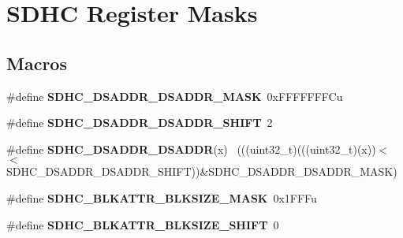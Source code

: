 \hypertarget{group___s_d_h_c___register___masks}{}\section{S\+D\+H\+C Register Masks}
\label{group___s_d_h_c___register___masks}
\subsection*{Macros}
\begin{DoxyCompactItemize}
\item 
\hypertarget{group___s_d_h_c___register___masks_ga0879039aa6d312f63642daf292ea07e1}{}\#define {\bfseries S\+D\+H\+C\+\_\+\+D\+S\+A\+D\+D\+R\+\_\+\+D\+S\+A\+D\+D\+R\+\_\+\+M\+A\+S\+K}~0x\+F\+F\+F\+F\+F\+F\+F\+Cu\label{group___s_d_h_c___register___masks_ga0879039aa6d312f63642daf292ea07e1}

\item 
\hypertarget{group___s_d_h_c___register___masks_gaab7280ffe17d17dc4e36a58270c97edb}{}\#define {\bfseries S\+D\+H\+C\+\_\+\+D\+S\+A\+D\+D\+R\+\_\+\+D\+S\+A\+D\+D\+R\+\_\+\+S\+H\+I\+F\+T}~2\label{group___s_d_h_c___register___masks_gaab7280ffe17d17dc4e36a58270c97edb}

\item 
\hypertarget{group___s_d_h_c___register___masks_gabf3237816737e9f61afc592a4262c3c3}{}\#define {\bfseries S\+D\+H\+C\+\_\+\+D\+S\+A\+D\+D\+R\+\_\+\+D\+S\+A\+D\+D\+R}(x)                                    ~(((uint32\+\_\+t)(((uint32\+\_\+t)(x))$<$$<$S\+D\+H\+C\+\_\+\+D\+S\+A\+D\+D\+R\+\_\+\+D\+S\+A\+D\+D\+R\+\_\+\+S\+H\+I\+F\+T))\&S\+D\+H\+C\+\_\+\+D\+S\+A\+D\+D\+R\+\_\+\+D\+S\+A\+D\+D\+R\+\_\+\+M\+A\+S\+K)\label{group___s_d_h_c___register___masks_gabf3237816737e9f61afc592a4262c3c3}

\item 
\hypertarget{group___s_d_h_c___register___masks_ga15a1d67cd23b4eaae16cf10809520195}{}\#define {\bfseries S\+D\+H\+C\+\_\+\+B\+L\+K\+A\+T\+T\+R\+\_\+\+B\+L\+K\+S\+I\+Z\+E\+\_\+\+M\+A\+S\+K}~0x1\+F\+F\+Fu\label{group___s_d_h_c___register___masks_ga15a1d67cd23b4eaae16cf10809520195}

\item 
\hypertarget{group___s_d_h_c___register___masks_gab4dbeb59800b35d4f9e1d12f27a3f4d8}{}\#define {\bfseries S\+D\+H\+C\+\_\+\+B\+L\+K\+A\+T\+T\+R\+\_\+\+B\+L\+K\+S\+I\+Z\+E\+\_\+\+S\+H\+I\+F\+T}~0\label{group___s_d_h_c___register___masks_gab4dbeb59800b35d4f9e1d12f27a3f4d8}


\end{DoxyCompactItemize}
